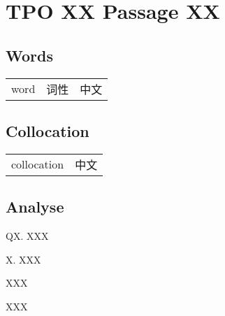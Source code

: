 \section{TPO XX Passage XX}

\subsection{Words}

\begin{tabular}{lll}
    word & 词性 & 中文\\
\end{tabular}

\subsection{Collocation}

\begin{tabular}{ll}
    collocation & 中文\\
\end{tabular}

\newpage

\subsection{Analyse}

\begin{blk}
    \begin{qst}
        QX. XXX
    \end{qst}

    \begin{chc}
        X. XXX
    \end{chc}

    \begin{psgq}
        XXX
    \end{psgq}

    \begin{nlz}
        XXX
    \end{nlz}
\end{blk}

\newpage